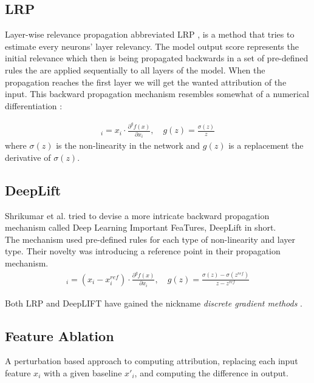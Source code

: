 \documentclass[12pt]{report}
\begin{document}
\subsection{LRP}
Layer-wise relevance propagation abbreviated LRP \cite{LRP} \cite{DBLP:journals/corr/MontavonSM17}, is a method that tries to estimate every neurons' layer relevancy. The model output score represents the initial relevance which then is being propagated backwards in a set of pre-defined rules the are applied sequentially to all layers of the model. When the propagation reaches the first layer we will get the wanted attribution of the input. This backward propagation mechanism resembles somewhat of a numerical differentiation \cite{DBLP:journals/corr/abs-2012-14261}:  

\begin{align*}
	[E_\text{LRP}(f, x)]_i  =  x_i \cdot \frac{\partial^{g}f(x)}{\partial x_i}, \quad g(z) = \frac{\sigma(z)}{z}
\end{align*}
where $\sigma(z)$ is the non-linearity in the network and $g(z)$ is a replacement the derivative of $\sigma(z)$.
	
\subsection{DeepLift}
Shrikumar et al. \cite{DBLP:journals/corr/ShrikumarGK17} tried to devise a more intricate backward propagation mechanism called Deep Learning Important FeaTures, DeepLift in short. \\

The mechanism used pre-defined rules for each type of non-linearity and layer type. Their novelty was introducing a reference point in their propagation mechanism.  
\begin{align*}
	[E_\text{DeepLift}(f, x)]_i  =  (x_i-x_i^{ref}) \cdot \frac{\partial^{g}f(x)}{\partial x_i}, \quad g(z) = \frac{\sigma(z)-\sigma(z^{ref})}{z-z^{ref}}
\end{align*}

Both LRP and DeepLIFT have gained the nickname  \textit{discrete gradient methods} \cite{DBLP:journals/corr/abs-2012-14261}.

\subsection{Feature Ablation}
A perturbation based approach to computing attribution, replacing each input feature $x_i$ with a given baseline $x'_i$, and computing the difference in output. 
\end{document}
